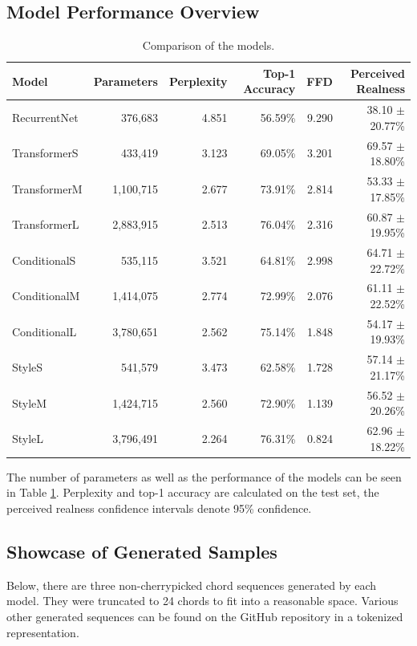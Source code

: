 \documentclass{article}
\begin{document}
\subsection{Model Performance Overview}

\begin{table}[!htbp]
    \centering
    \begin{tabular}{lrrrrr}
        \toprule
        Model & Parameters & Perplexity & Top-1 Accuracy & FFD & Perceived Realness \\
        \midrule
        RecurrentNet & 376,683 & 4.851 & 56.59\% & 9.290 & 38.10 $\pm$ 20.77\%  \\
        TransformerS & 433,419 & 3.123 & 69.05\% & 3.201 & 69.57 $\pm$ 18.80\% \\
        TransformerM & 1,100,715 & 2.677 & 73.91\% & 2.814 & 53.33 $\pm$ 17.85\% \\
        TransformerL & 2,883,915 & 2.513 & 76.04\% & 2.316 & 60.87 $\pm$ 19.95\% \\
        ConditionalS & 535,115 & 3.521 & 64.81\% & 2.998 & 64.71 $\pm$ 22.72\% \\
        ConditionalM & 1,414,075 & 2.774 & 72.99\% & 2.076 & 61.11 $\pm$ 22.52\% \\
        ConditionalL & 3,780,651 & 2.562 & 75.14\% & 1.848 & 54.17 $\pm$ 19.93\% \\
        StyleS & 541,579 & 3.473 & 62.58\% & 1.728 & 57.14 $\pm$ 21.17\% \\
        StyleM & 1,424,715 & 2.560 & 72.90\% & 1.139 & 56.52 $\pm$ 20.26\% \\
        StyleL & 3,796,491 & 2.264 & 76.31\% & 0.824 & 62.96 $\pm$ 18.22\% \\
        \bottomrule
    \end{tabular}
    \caption{Comparison of the models.}
    \label{tab:model_comparison}
\end{table}

The number of parameters as well as the performance of the models can be seen in Table \ref{tab:model_comparison}. Perplexity and top-1 accuracy are calculated on the test set, the perceived realness confidence intervals denote 95\% confidence.

\FloatBarrier

\subsection{Showcase of Generated Samples}

Below, there are three non-cherrypicked chord sequences generated by each model. They were truncated to 24 chords to fit into a reasonable space. Various other generated sequences can be found on the GitHub repository in a tokenized representation.
\end{document}
